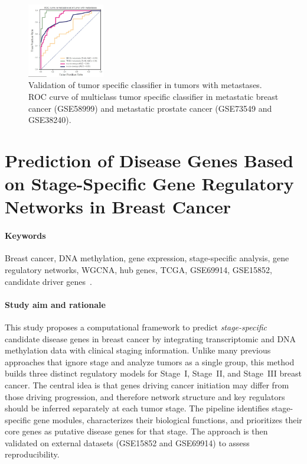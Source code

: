 \documentclass[10pt]{extarticle}
\begin{document}
\begin{figure}[H]
    \centering
    \includegraphics[width=0.3\textwidth]{Figures/Validation of tumor specific classifier in tumors with metastases.jpg} %
    \caption{Validation of tumor specific classifier in tumors with metastases. ROC curve of multiclass tumor specific classifier in
metastatic breast cancer (GSE58999) and metastatic prostate cancer (GSE73549 and GSE38240).}
    \label{fig:ROC}
\end{figure}


\section{Prediction of Disease Genes Based on Stage-Specific Gene Regulatory Networks in Breast Cancer}

\paragraph{Keywords}
Breast cancer, DNA methylation, gene expression, stage-specific analysis, gene regulatory networks, WGCNA, hub genes, TCGA, GSE69914, GSE15852, candidate driver genes~\cite{fan2021stagegrn}.

\paragraph{Study aim and rationale}
This study proposes a computational framework to predict \textit{stage-specific} candidate disease genes in breast cancer by integrating transcriptomic and DNA methylation data with clinical staging information. Unlike many previous approaches that ignore stage and analyze tumors as a single group, this method builds three distinct regulatory models for Stage~I, Stage~II, and Stage~III breast cancer. The central idea is that genes driving cancer initiation may differ from those driving progression, and therefore network structure and key regulators should be inferred separately at each tumor stage. The pipeline identifies stage-specific gene modules, characterizes their biological functions, and prioritizes their core genes as putative disease genes for that stage. The approach is then validated on external datasets (GSE15852 and GSE69914) to assess reproducibility.
\end{document}
